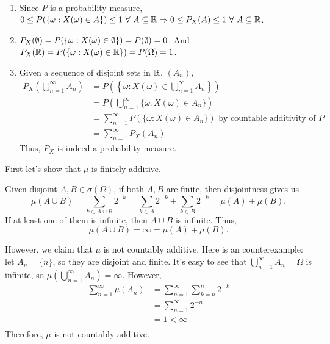 \documentclass[12pt]{article}
\begin{document}
\begin{problem}[4]
~\begin{enumerate}[label=(\roman*)]
	\item Since $ P$ is a probability measure,  $ 0 \leq P(\{\omega: X(\omega) \in A\} ) \leq 1 \ \forall \ A \subseteq \mathbb{R} \Rightarrow 0\leq P_X(A) \leq 1 \ \forall \ A \subseteq \mathbb{R}$.
	\item $ P_X( \emptyset) = P(\{\omega: X(\omega) \in \emptyset\} ) = P( \emptyset)=0$. And $ P_X(\mathbb{R}) = P(\{\omega:X(\omega) \in \mathbb{R}\} ) = P(\Omega) =1$.
	\item Given a sequence of disjoint sets in $ \mathbb{R}$, $ (A_n)$,
		\begin{align*}
			P_X\left( \bigcup_{ n =1}^{\infty} A_n \right) &= P\left( \left\{ \omega:X(\omega) \in \bigcup_{ n =1}^{\infty} A_n \right\}   \right)  \\
								       &= P\left( \bigcup_{ n =1}^{\infty} \{\omega: X(\omega) \in A_n\}  \right)   \\
								       &= \sum_{ n= 1}^{\infty} P(\{\omega:X(\omega) \in A_n\} ) \text{ by countable additivity of } P\\
								       &= \sum_{ n= 1}^{\infty} P_X(A_n) 
		\end{align*}
		Thus, $ P_X$ is indeed a probability measure.
\end{enumerate}
\end{problem}

\begin{problem}[5]
	First let's show that $ \mu$ is finitely additive.

	Given disjoint $ A,B \in \sigma(\Omega)$, if both $ A,B$ are finite,  then disjointness gives us
	\[
		\mu(A \cup B) = \sum_{k \in A \cup B} 2^{-k} = \sum_{k \in A} 2^{-k} + \sum_{k \in B} 2^{-k} = \mu(A) + \mu(B)
	.\]
	If at least one of them is infinite, then $ A \cup B$ is infinite. Thus,
	\[
		\mu(A \cup B) = \infty =\mu(A) + \mu(B)
	.\]

	However, we claim that $ \mu$ is not countably additive. Here is an counterexample: let $ A_n = \{n\} $, so they are disjoint and finite. It's easy to see that $ \bigcup_{ n =1}^{\infty} A_n =\Omega$ is infinite, so $ \mu\left( \bigcup_{ n =1}^{\infty} A_n \right) = \infty $. However,
\begin{align*}
	\sum_{n=1}^{\infty} \mu(A_n) &= \sum_{ n= 1}^{\infty} \sum_{k=n}^n 2^{-k}\\
	&= \sum_{n= 1}^{\infty} 2^{-n} \\
	&= 1 < \infty \\
\end{align*} 
Therefore, $\mu$ is not countably additive.
\end{problem}
\end{document}
